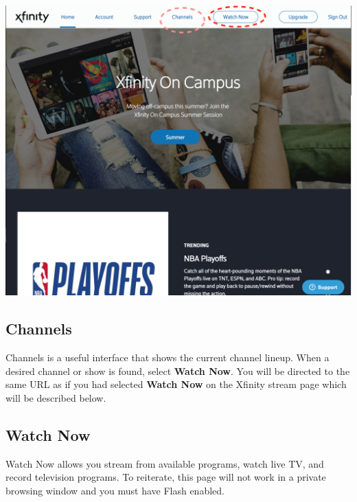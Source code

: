 \documentclass[a4paper, 11pt]{article}
\begin{document}
\includegraphics[width=\linewidth, keepaspectratio]{home.png}
\subsection*{
  Channels 
}

Channels is a useful interface that shows the current channel lineup. 
When a desired channel or show is found, select \textbf{Watch Now}. You
will be directed to the same URL as if you had selected \textbf{Watch Now} on
the Xfinity stream page which will be described below.

\subsection*{
  Watch Now
}

Watch Now allows you stream from available programs, watch live TV, and record television programs.  To reiterate, this page will not work in a private 
browsing window and you must have Flash enabled.  
\end{document}
